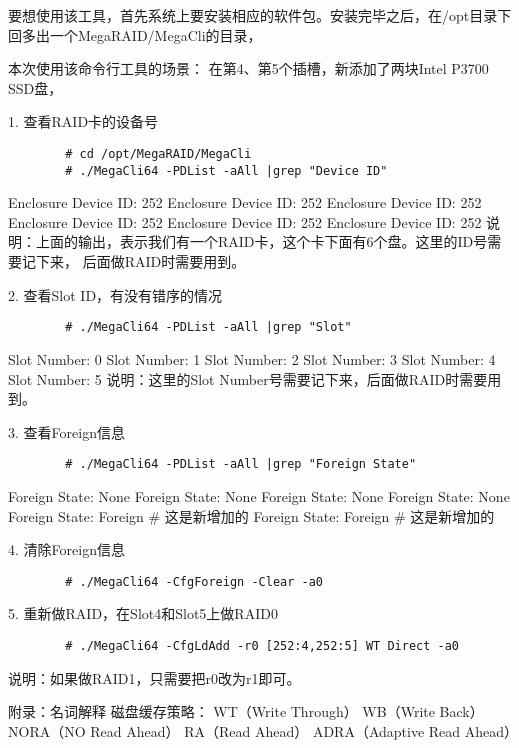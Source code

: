 \documentclass[a4paper,11pt]{book}
\begin{document}
	要想使用该工具，首先系统上要安装相应的软件包。安装完毕之后，在/opt目录下回多出一个MegaRAID/MegaCli的目录，
	
	本次使用该命令行工具的场景：
	在第4、第5个插槽，新添加了两块Intel P3700 SSD盘，
	
	1. 查看RAID卡的设备号
	\begin{verbatim}
		# cd /opt/MegaRAID/MegaCli
		# ./MegaCli64 -PDList -aAll |grep "Device ID"
	\end{verbatim}

	Enclosure Device ID: 252
	Enclosure Device ID: 252 
	Enclosure Device ID: 252
	Enclosure Device ID: 252
	Enclosure Device ID: 252
	Enclosure Device ID: 252
	说明：上面的输出，表示我们有一个RAID卡，这个卡下面有6个盘。这里的ID号需要记下来，
	后面做RAID时需要用到。
	
	2. 查看Slot ID，有没有错序的情况
	\begin{verbatim}
		# ./MegaCli64 -PDList -aAll |grep "Slot"  
	\end{verbatim}

	Slot Number: 0
	Slot Number: 1
	Slot Number: 2
	Slot Number: 3
	Slot Number: 4
	Slot Number: 5
	说明：这里的Slot Number号需要记下来，后面做RAID时需要用到。
	
	3. 查看Foreign信息
	\begin{verbatim}
		# ./MegaCli64 -PDList -aAll |grep "Foreign State"
	\end{verbatim}
	Foreign State: None
	Foreign State: None 
	Foreign State: None
	Foreign State: None
	Foreign State: Foreign \# 这是新增加的
	Foreign State: Foreign \# 这是新增加的
	
	4. 清除Foreign信息
	\begin{verbatim}
		# ./MegaCli64 -CfgForeign -Clear -a0
	\end{verbatim}
	
	5. 重新做RAID，在Slot4和Slot5上做RAID0
	\begin{verbatim}
		# ./MegaCli64 -CfgLdAdd -r0 [252:4,252:5] WT Direct -a0
	\end{verbatim}
	说明：如果做RAID1，只需要把r0改为r1即可。
	
	附录：名词解释
	磁盘缓存策略：
	WT（Write Through）
	WB（Write Back）
	NORA（NO Read Ahead）
	RA（Read Ahead）
	ADRA（Adaptive Read Ahead）
\end{document}
